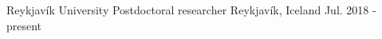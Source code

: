 


\begin{cventries}


  \cventry
  {Reykjavík University} %
  {Postdoctoral researcher} %
  {Reykjavík, Iceland} %
  {Jul. 2018 - present} %
  {
  }


\end{cventries}

\vspace{-2em}
